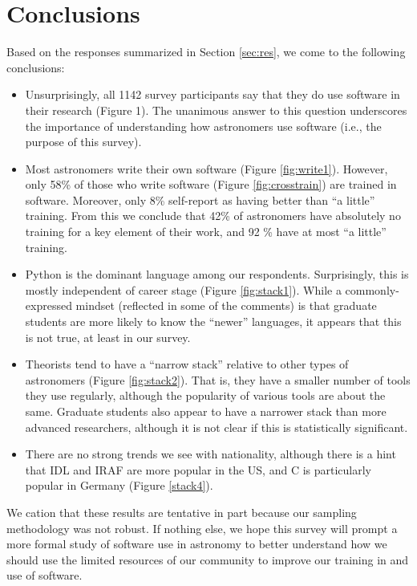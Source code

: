 
\section{Conclusions}
\label{sec:conc}


Based on the responses summarized in Section \ref{sec:res}, we come to the following conclusions:



\begin{itemize}
\item Unsurprisingly, all 1142 survey participants say that they do use software in their research (Figure 1). The unanimous answer to this question underscores the importance of understanding how astronomers use software (i.e., the purpose of this survey).
\item Most astronomers write their own software (Figure \ref{fig:write1}).  However, only 58\% of those who write software (Figure \ref{fig:crosstrain}) are trained in software.  Moreover, only 8\% self-report as having better than ``a little'' training.  From this we conclude that 42\% of astronomers have absolutely no training for a key element of their work, and 92 \% have at most ``a little'' training.  
\item Python is the dominant language among our respondents.  Surprisingly, this is mostly independent of career stage (Figure \ref{fig:stack1}).  While a commonly-expressed mindset (reflected in some of the comments) is that graduate students are more likely to know the ``newer'' languages, it appears that this is not true, at least in our survey.
\item Theorists tend to have a ``narrow stack'' relative to other types of astronomers (Figure \ref{fig:stack2}).  That is, they have a smaller number of tools they use regularly, although the popularity of various tools are about the same.  Graduate students also appear to have a narrower stack than more advanced researchers, although it is not clear if this is statistically significant. 
\item There are no strong trends we see with nationality, although there is a hint that IDL and IRAF are more popular in the US, and C is particularly popular in Germany (Figure \ref{stack4}).
\end{itemize}

We cation that these results are tentative in part because our sampling methodology was not robust.  If nothing else, we hope this survey will prompt a more formal study of software use in astronomy to better understand how we should use the limited resources of our community to improve our training in and use of software.

